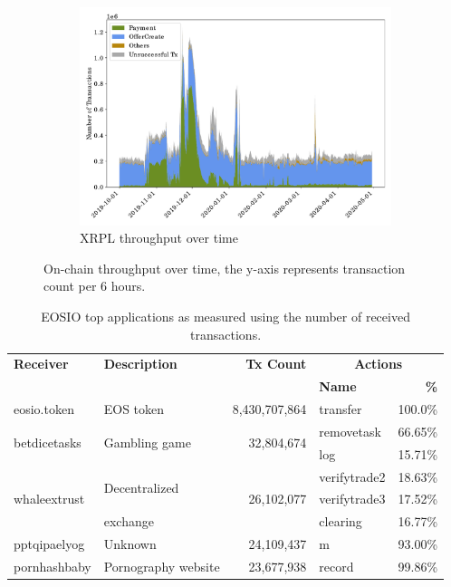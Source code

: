 \begin{figure}[tbp]
\begin{subfigure}{\columnwidth}
        \includegraphics[height=.27\textheight]{./4-transactions-security/figures/xrp-chart-area.pdf}
        \caption{XRPL throughput over time}
        \label{fig:xrp-throughput-time}
    \end{subfigure}
    \caption{On-chain throughput over time, the y-axis represents transaction count per 6 hours.}
    \label{fig:throughput-time}
\end{figure}

\begin{table}[tb]
    \centering
\caption{EOSIO top applications as measured using the number of received transactions.}
    \label{tab:eos-top-applications}
    \setlength{\tabcolsep}{2pt}
    \begin{tabular}{l l r l r}
    \toprule
    \textbf{Receiver} & \textbf{Description} & \textbf{Tx Count} & \multicolumn{2}{c}{\bf Actions}\\
         &         &    &  \bf Name   & \bf \% \\
    \midrule
      eosio.token & EOS token & 8,430,707,864 & transfer & 100.0\%\\
      \midrule
      \multirow{2}{*}{betdicetasks} & \multirow{2}{*}{Gambling game} & \multirow{2}{*}{32,804,674} & removetask & 66.65\%\\
                      & & & log & 15.71\%\\
      \midrule
      \multirow{3}{*}{whaleextrust} & \multirow{2}{*}{Decentralized} & \multirow{3}{*}{26,102,077} & verifytrade2 & 18.63\%\\
                      & & & verifytrade3 & 17.52\%\\
                      & exchange & & clearing & 16.77\%\\
      \midrule
      pptqipaelyog & Unknown & 24,109,437 & m & 93.00\%\\
      \midrule
      pornhashbaby & Pornography website & 23,677,938 & record & 99.86\%\\
    \bottomrule
    \end{tabular}
\end{table}


